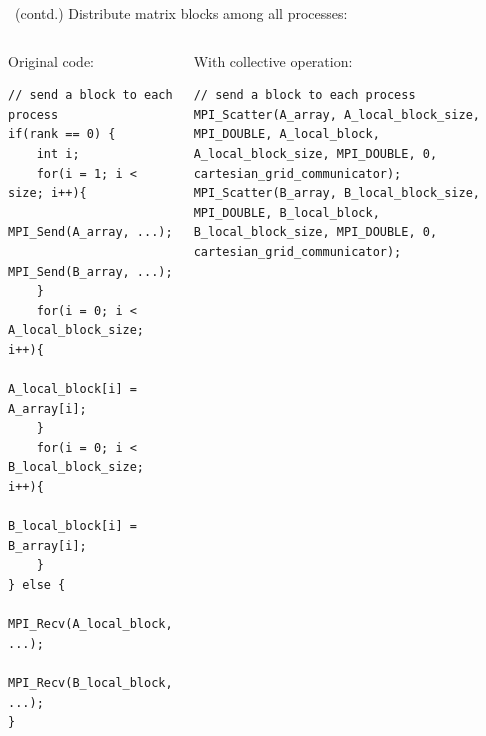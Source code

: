 \documentclass[9pt,pdftex,xcolor=dvipsnames]{beamer}
\begin{document}
\begin{frame}[fragile]{\insertsubsection \ (contd.)}
Distribute matrix blocks among all processes:
\begin{columns}
\begin{block}{Original code:}
\begin{lstlisting}
// send a block to each process
if(rank == 0) {
    int i;
    for(i = 1; i < size; i++){
        MPI_Send(A_array, ...);
        MPI_Send(B_array, ...);
    }
    for(i = 0; i < A_local_block_size; i++){
        A_local_block[i] = A_array[i];
    }
    for(i = 0; i < B_local_block_size; i++){
        B_local_block[i] = B_array[i];
    }
} else {
    MPI_Recv(A_local_block, ...);
    MPI_Recv(B_local_block, ...);
}
\end{lstlisting}
\end{block}

\begin{block}{With collective operation:}
\begin{lstlisting}	
// send a block to each process
MPI_Scatter(A_array, A_local_block_size, MPI_DOUBLE, A_local_block, A_local_block_size, MPI_DOUBLE, 0, cartesian_grid_communicator);
MPI_Scatter(B_array, B_local_block_size, MPI_DOUBLE, B_local_block, B_local_block_size, MPI_DOUBLE, 0, cartesian_grid_communicator);
\end{lstlisting}
\end{block}
\end{columns}
\end{frame}
\end{document}
